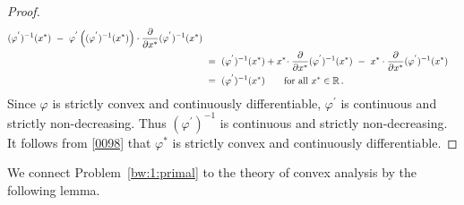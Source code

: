 \begin{proof}
\begin{align}
\begin{split}
    (
    \varphi^{'}
    )^{-1}
    (x^*)
    \ 
    -
    \ 
    \varphi^{'}
    \left( 
      (
    \varphi^{'}
    )^{-1}
    (x^*)
    \right)
    \cdot
    \frac{\partial}{\partial x^*}
    (
    \varphi^{'}
    )^{-1}
    (x^*)
    \\
    &
    \ 
    =
    \ 
    (
    \varphi^{'}
    )^{-1}
    (x^*)
    +
    x^*
    \!
    \cdot
    \frac{\partial}{\partial x^*}
    (
    \varphi^{'}
    )^{-1}
    (x^*)
    \ 
    -
    \ 
    x^*
    \cdot
    \frac{\partial}{\partial x^*}
    (
    \varphi^{'}
    )^{-1}
    (x^*)
    \\
    &
    \ 
    =
    \ 
    (
    \varphi^{'}
    )^{-1}
    (x^*)
    \qquad
    \text{for all}\ 
    x^*\in\R
    \,.
    \end{split}
  \end{align}
  Since $\varphi$ is strictly convex and continuously differentiable, 
  $\varphi^{'}$ is continuous and strictly non-decreasing.
  Thus 
  $
    (
    \varphi^{'}
    )^{-1}
  $
  is continuous and strictly non-decreasing.
  It follows from \eqref{0098} that $\varphi^*$ is strictly convex and continuously differentiable.
\end{proof}
We connect Problem~\ref{bw:1:primal} to the theory of convex analysis by the following lemma.
